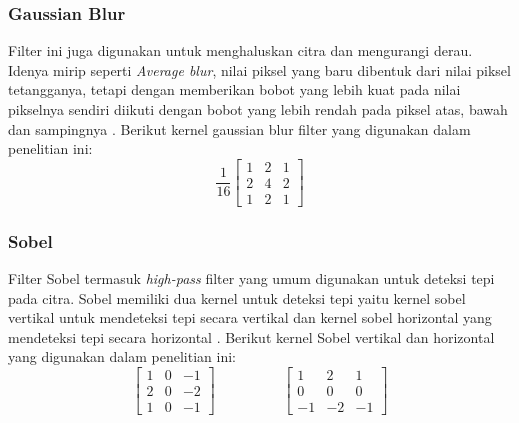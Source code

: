\subsubsection{Gaussian Blur}
Filter ini juga digunakan untuk menghaluskan citra dan mengurangi derau. Idenya mirip seperti \textit{Average blur}, nilai piksel yang baru dibentuk dari nilai piksel tetangganya, tetapi dengan memberikan bobot yang lebih kuat pada nilai pikselnya sendiri diikuti dengan bobot yang lebih rendah pada piksel atas, bawah dan sampingnya \cite{soa:dmitry}. Berikut kernel gaussian blur filter yang digunakan dalam penelitian ini:
\begin{equation}
    \label{kernel:gaussianblur}
    \frac{1}{16}
    \left[
    \begin{matrix}
 1 & 2 & 1 \\
 2 & 4 & 2 \\
 1 & 2 & 1
    \end{matrix}
    \right]
\end{equation}

\subsubsection{Sobel}
Filter Sobel termasuk \textit{high-pass} filter yang umum digunakan untuk deteksi tepi pada citra. Sobel memiliki dua kernel untuk deteksi tepi yaitu kernel sobel vertikal untuk mendeteksi tepi secara vertikal dan kernel sobel horizontal yang mendeteksi tepi secara horizontal \cite{pdf:marcin}. Berikut kernel Sobel vertikal dan horizontal yang digunakan dalam penelitian ini:
\begin{equation}
    \label{kernel:sobel}
    \left[
    \begin{matrix}
 1 & 0 & -1 \\
 2 & 0 & -2 \\
 1 & 0 & -1
    \end{matrix}
    \right]
    \hspace{2cm}
    \left[
 \begin{matrix}
 1 & 2 & 1 \\
 0 & 0 & 0 \\
 -1 & -2 & -1
    \end{matrix}
    \right]
\end{equation}

